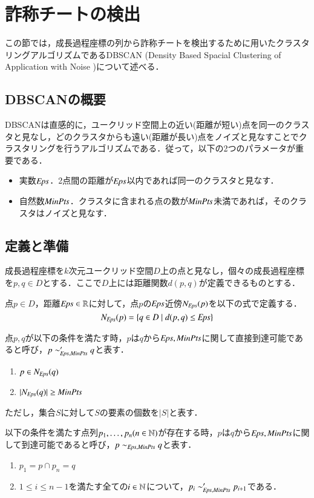\section{詐称チートの検出}
この節では，成長過程座標の列から詐称チートを検出するために用いたクラスタリングアルゴリズムであるDBSCAN (Density Based Spacial Clustering of Application with Noise \cite{dbscan})について述べる．

\subsection{DBSCANの概要}
DBSCANは直感的に，ユークリッド空間上の近い(距離が短い)点を同一のクラスタと見なし，どのクラスタからも遠い(距離が長い)点をノイズと見なすことでクラスタリングを行うアルゴリズムである．従って，以下の2つのパラメータが重要である．

\begin{itemize}
\item
実数$\Eps$．2点間の距離が$\Eps$以内であれば同一のクラスタと見なす．
\item
自然数${\it MinPts}$．クラスタに含まれる点の数が${\it MinPts}$未満であれば，そのクラスタはノイズと見なす．
\end{itemize}

\subsection{定義と準備}
成長過程座標を$k$次元ユークリッド空間$D$上の点と見なし，個々の成長過程座標を$p,q \in D$とする．ここで$D$上には距離関数$d(p,q)$が定義できるものとする．

\begin{mathdef}[$\Eps$近傍]
点$p \in D$，距離${\it Eps} \in \mathbb{R}$に対して，点$p$の$\Eps$近傍$N_{{\it Eps}}(p)$を以下の式で定義する．
\[
	N_{\it Eps}(p) = \{q \in D \mid d(p,q) \leq {\it Eps}\}
\]
\end{mathdef}

\begin{mathdef}[直接到達可能性]
点$p,q$が以下の条件を満たす時，$p$は$q$から${\it Eps}, {\it MinPts}$に関して直接到達可能であると呼び，$p \sim_{{\it Eps}, {\it MinPts}}' q$と表す．
\begin{enumerate}
\item
$p \in N_{\it Eps}(q)$
\item
$|N_{\it Eps}(q)| \geq {\it MinPts}$
\end{enumerate}

ただし，集合$S$に対して$S$の要素の個数を$|S|$と表す．
\end{mathdef}

\begin{mathdef}[到達可能性]
以下の条件を満たす点列$p_1, \dots, p_n (n \in \mathbb{N})$が存在する時，$p$は$q$から${\it Eps}, {\it MinPts}$に関して到達可能であると呼び，$p \sim_{{\it Eps}, {\it MinPts}} q$と表す．

\begin{enumerate}
\item
$p_1 = p \cap p_n = q$
\item
$1 \leq i \leq n-1$を満たす全ての$i \in \mathbb{N}$について，$p_i \sim_{{\it Eps}, {\it MinPts}}' p_{i+1}$である．
\end{enumerate}
\end{mathdef}

